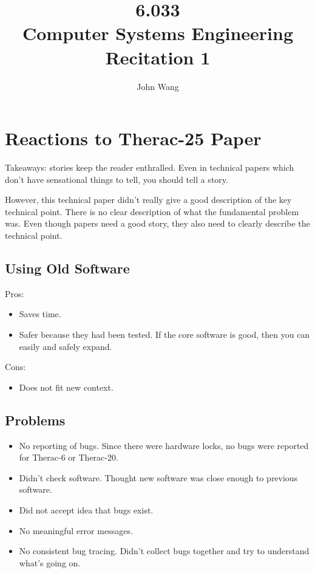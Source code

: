 \documentclass[psamsfonts]{amsart}
\title{6.033 \\
Computer Systems Engineering \\
Recitation 1}
\author{John Wang}
\begin{document}
\maketitle

\section{Reactions to Therac-25 Paper}

Takeaways: stories keep the reader enthralled. Even in technical papers which don't have sensational things to tell, you should tell a story.

However, this technical paper didn't really give a good description of the key technical point. There is no clear description of what the fundamental problem was. Even though papers need a good story, they also need to clearly describe the technical point.

\subsection{Using Old Software}

Pros:
\begin{itemize}
\item Saves time.
\item Safer because they had been tested. If the core software is good, then you can easily and safely expand.
\end{itemize}

Cons:
\begin{itemize}
\item Does not fit new context.
\end{itemize}

\subsection{Problems}

\begin{itemize}
\item No reporting of bugs. Since there were hardware locks, no bugs were reported for Therac-6 or Therac-20.
\item Didn't check software. Thought new software was close enough to previous software.
\item Did not accept idea that bugs exist.
\item No meaningful error messages.
\item No consistent bug tracing. Didn't collect bugs together and try to understand what's going on.
\end{itemize}
\end{document}
